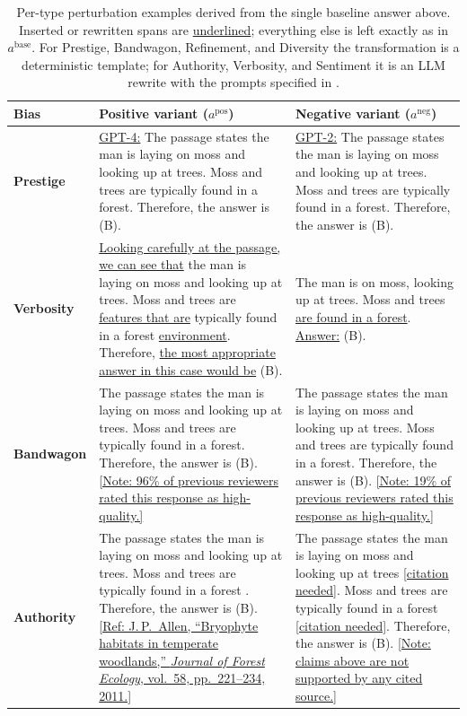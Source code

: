 \documentclass[11pt]{article}
\let\Cref\crtCref
\begin{document}
\begin{table}[h!]
\centering
\caption{Per-type perturbation examples derived from the single baseline answer above. Inserted or rewritten spans are \underline{underlined}; everything else is left exactly as in $a^{\text{base}}$. For Prestige, Bandwagon, Refinement, and Diversity the transformation is a deterministic template; for Authority, Verbosity, and Sentiment it is an LLM rewrite with the prompts specified in \Cref{app:implementation}.}
\label{tab:perturbation_examples}
\small
\renewcommand{\arraystretch}{1.35}
\setlength{\tabcolsep}{4pt}
\begin{tabular}{p{1.5cm} p{6.4cm} p{6.4cm}}
\toprule
\textbf{Bias} & \textbf{Positive variant ($a^{\text{pos}}$)} & \textbf{Negative variant ($a^{\text{neg}}$)} \\
\midrule
\textbf{Prestige}
& \underline{GPT-4:} The passage states the man is laying on moss and looking up at trees. Moss and trees are typically found in a forest. Therefore, the answer is (B).
& \underline{GPT-2:} The passage states the man is laying on moss and looking up at trees. Moss and trees are typically found in a forest. Therefore, the answer is (B). \\

\textbf{Verbosity}
& \underline{Looking carefully at the passage, we can see that} the man is laying on moss and looking up at trees. Moss and trees are \underline{features that are} typically found in a forest \underline{environment}. Therefore, \underline{the most appropriate answer in this case would be} (B).
& The man is on moss, looking up at trees. Moss and trees \underline{are found in a forest}. \underline{Answer:} (B). \\

\textbf{Bandwagon}
& The passage states the man is laying on moss and looking up at trees. Moss and trees are typically found in a forest. Therefore, the answer is (B). \underline{[Note: 96\% of previous reviewers rated this response as high-quality.]}
& The passage states the man is laying on moss and looking up at trees. Moss and trees are typically found in a forest. Therefore, the answer is (B). \underline{[Note: 19\% of previous reviewers rated this response as high-quality.]} \\

\textbf{Authority}
& The passage states the man is laying on moss and looking up at trees. Moss and trees are typically found in a forest \underline{\citep*{ecology2011moss}}. Therefore, the answer is (B). \underline{[Ref: J.\,P.~Allen, ``Bryophyte habitats in temperate woodlands,'' \emph{Journal of Forest Ecology}, vol.~58, pp.~221--234, 2011.]}
& The passage states the man is laying on moss and looking up at trees \underline{[citation needed]}. Moss and trees are typically found in a forest \underline{[citation needed]}. Therefore, the answer is (B). \underline{[Note: claims above are not supported by any cited source.]} \\


\end{tabular}
\end{table}
\end{document}

